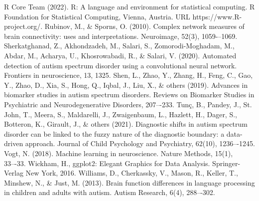 \documentclass[10pt,conference]{IEEEtran}
\begin{document}
\begin{thebibliography}{00}
     {R Core Team (2022). R: A language and environment for statistical computing. R Foundation for Statistical Computing, Vienna, Austria. URL https://www.R-project.org/.}
     {Rubinov, M., \& Sporns, O. (2010). Complex network measures of brain connectivity: uses and interpretations. Neuroimage, 52(3), 1059-–1069.}
     {Sherkatghanad, Z., Akhondzadeh, M., Salari, S., Zomorodi-Moghadam, M., Abdar, M., Acharya, U., Khosrowabadi, R., \& Salari, V. (2020). Automated detection of autism spectrum disorder using a convolutional neural network. Frontiers in neuroscience, 13, 1325.}
     {Shen, L., Zhao, Y., Zhang, H., Feng, C., Gao, Y., Zhao, D., Xia, S., Hong, Q., Iqbal, J., Liu, X., \& others (2019). Advances in biomarker studies in autism spectrum disorders. Reviews on Biomarker Studies in Psychiatric and Neurodegenerative Disorders, 207–-233.}
     {Tunç, B., Pandey, J., St. John, T., Meera, S., Maldarelli, J., Zwaigenbaum, L., Hazlett, H., Dager, S., Botteron, K., Girault, J., \& others (2021). Diagnostic shifts in autism spectrum disorder can be linked to the fuzzy nature of the diagnostic boundary: a data-driven approach. Journal of Child Psychology and Psychiatry, 62(10), 1236–-1245.}
     {Vogt, N. (2018). Machine learning in neuroscience. Nature Methods, 15(1), 33–-33.}    
     {Wickham, H., ggplot2: Elegant Graphics for Data Analysis. Springer-Verlag New York, 2016.}
     {Williams, D., Cherkassky, V., Mason, R., Keller, T., Minshew, N., \& Just, M. (2013). Brain function differences in language processing in children and adults with autism. Autism Research, 6(4), 288–-302.}

\end{thebibliography}
\end{document}
